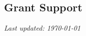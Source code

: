 \documentclass[margin,line]{res}
\begin{document}
\begin{resume}
\section{\sc Grant Support}


\end{resume}

\vfill

\hfill \textit{Last updated: \today}
\end{document}
